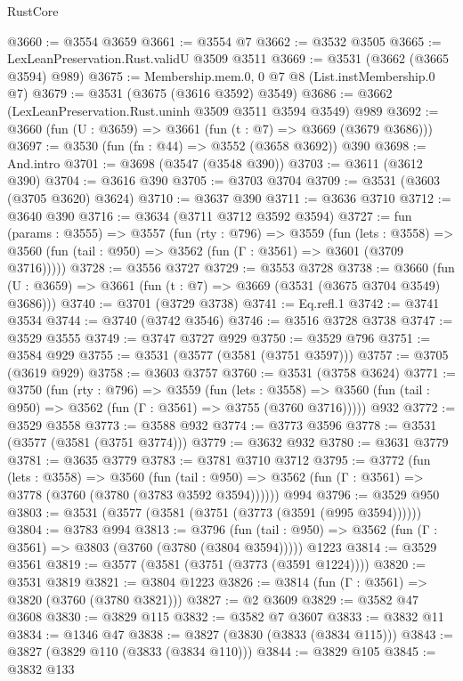 \begin{lexlean}{RustCore}
\begin{coremodule}
@3660 := @3554 @3659
@3661 := @3554 @7
@3662 := @3532 @3505
@3665 := LexLeanPreservation.Rust.validU @3509 @3511
@3669 := @3531 (@3662 (@3665 @3594) @989)
@3675 := Membership.mem.{0, 0} @7 @8 (List.instMembership.{0} @7)
@3679 := @3531 (@3675 (@3616 @3592) @3549)
@3686 := @3662 (LexLeanPreservation.Rust.uninh @3509 @3511 @3594 @3549) @989
@3692 := @3660 (fun (U : @3659) => @3661 (fun (t : @7) => @3669 (@3679 @3686)))
@3697 := @3530 (fun (fn : @44) => @3552 (@3658 @3692)) @390
@3698 := And.intro
@3701 := @3698 (@3547 (@3548 @390))
@3703 := @3611 (@3612 @390)
@3704 := @3616 @390
@3705 := @3703 @3704
@3709 := @3531 (@3603 (@3705 @3620) @3624)
@3710 := @3637 @390
@3711 := @3636 @3710
@3712 := @3640 @390
@3716 := @3634 (@3711 @3712 @3592 @3594)
@3727 := fun (params : @3555) =>
  @3557
    (fun (rty : @796) =>
    @3559
      (fun (lets : @3558) =>
      @3560 (fun (tail : @950) => @3562 (fun (Γ : @3561) => @3601 (@3709 @3716)))))
@3728 := @3556 @3727
@3729 := @3553 @3728
@3738 := @3660 (fun (U : @3659) => @3661 (fun (t : @7) => @3669 (@3531 (@3675 @3704 @3549) @3686)))
@3740 := @3701 (@3729 @3738)
@3741 := Eq.refl.{1}
@3742 := @3741 @3534
@3744 := @3740 (@3742 @3546)
@3746 := @3516 @3728 @3738
@3747 := @3529 @3555
@3749 := @3747 @3727 @929
@3750 := @3529 @796
@3751 := @3584 @929
@3755 := @3531 (@3577 (@3581 (@3751 @3597)))
@3757 := @3705 (@3619 @929)
@3758 := @3603 @3757
@3760 := @3531 (@3758 @3624)
@3771 := @3750
    (fun (rty : @796) =>
    @3559
      (fun (lets : @3558) =>
      @3560 (fun (tail : @950) => @3562 (fun (Γ : @3561) => @3755 (@3760 @3716)))))
    @932
@3772 := @3529 @3558
@3773 := @3588 @932
@3774 := @3773 @3596
@3778 := @3531 (@3577 (@3581 (@3751 @3774)))
@3779 := @3632 @932
@3780 := @3631 @3779
@3781 := @3635 @3779
@3783 := @3781 @3710 @3712
@3795 := @3772
    (fun (lets : @3558) =>
    @3560
      (fun (tail : @950) => @3562 (fun (Γ : @3561) => @3778 (@3760 (@3780 (@3783 @3592 @3594))))))
    @994
@3796 := @3529 @950
@3803 := @3531 (@3577 (@3581 (@3751 (@3773 (@3591 (@995 @3594))))))
@3804 := @3783 @994
@3813 := @3796
    (fun (tail : @950) => @3562 (fun (Γ : @3561) => @3803 (@3760 (@3780 (@3804 @3594)))))
    @1223
@3814 := @3529 @3561
@3819 := @3577 (@3581 (@3751 (@3773 (@3591 @1224))))
@3820 := @3531 @3819
@3821 := @3804 @1223
@3826 := @3814 (fun (Γ : @3561) => @3820 (@3760 (@3780 @3821)))
@3827 := @2 @3609
@3829 := @3582 @47 @3608
@3830 := @3829 @115
@3832 := @3582 @7 @3607
@3833 := @3832 @11
@3834 := @1346 @47
@3838 := @3827 (@3830 (@3833 (@3834 @115)))
@3843 := @3827 (@3829 @110 (@3833 (@3834 @110)))
@3844 := @3829 @105
@3845 := @3832 @133

\end{coremodule}
\end{lexlean}
